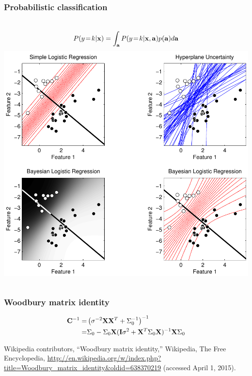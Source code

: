 \begin{frame}
\frametitle{Probabilistic classification}
\begin{columns}[c]
\begin{align*}
P(y\!=\!k|{\bf x}) = \int_{\bf a} P(y\!=\!k|{\bf x},{\bf a}) p({\bf a}) d{\bf a}
\end{align*}
\includegraphics[width=\textwidth]{logistic_regr}
\end{columns}
\end{frame}

\begin{frame}
\frametitle{Woodbury matrix identity}
\begin{align*}
{\bf C}^{-1} = & \left(\sigma^{-2}{\bf X}{\bf X}^T + \Sigma_0^{-1}\right)^{-1}\\
             = & \Sigma_0 - \Sigma_0 {\bf X}({\bf I}\sigma^2 + {\bf X}^T \Sigma_0 {\bf X})^{-1} {\bf X} \Sigma_0
\end{align*}

\vspace{0.25cm}
\begin{tiny}
Wikipedia contributors, ``Woodbury matrix identity,'' Wikipedia, The Free Encyclopedia, \url{http://en.wikipedia.org/w/index.php?title=Woodbury\_matrix\_identity\&oldid=638370219} (accessed April 1, 2015).\par
\end{tiny}
\end{frame}

